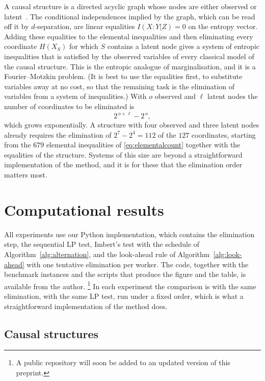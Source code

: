\documentclass[11pt]{article}
\theoremstyle{definition}
\begin{document}
A causal structure is a directed acyclic graph whose nodes are either observed or latent~\cite{pearl2009}. The conditional independences implied by the graph, which can be read off it by $d$-separation, are linear equalities $I(X\!:\!Y|Z)=0$ on the entropy vector. Adding these equalities to the elemental inequalities and then eliminating every coordinate $H(X_S)$ for which $S$ contains a latent node gives a system of entropic inequalities that is satisfied by the observed variables of every classical model of the causal structure. This is the entropic analogue of marginalisation, and it is a Fourier--Motzkin problem. (It is best to use the equalities first, to substitute variables away at no cost, so that the remaining task is the elimination of variables from a system of inequalities.) With $o$ observed and $\ell$ latent nodes the number of coordinates to be eliminated is
\begin{equation}
2^{\,o+\ell}-2^{\,o},
\label{eq:elimcount}
\end{equation}
which grows exponentially. A structure with four observed and three latent nodes already requires the elimination of $2^7-2^4=112$ of the $127$ coordinates, starting from the $679$ elemental inequalities of \eqref{eq:elementalcount} together with the equalities of the structure. Systems of this size are beyond a straightforward implementation of the method, and it is for these that the elimination order matters most.

\section{Computational results}
\label{sec:results}

All experiments use our Python implementation, which contains the elimination step, the sequential LP test, Imbert's test with the schedule of Algorithm~\ref{alg:alternation}, and the look-ahead rule of Algorithm~\ref{alg:look-ahead} with one tentative elimination per worker. The code, together with the benchmark instances and the scripts that produce the figure and the table, is available from the author.%
\footnote{A public repository will soon be added to an updated version of this preprint.}
In each experiment the comparison is with the same elimination, with the same LP test, run under a fixed order, which is what a straightforward implementation of the method does.

\subsection{Causal structures}
\label{sec:resultscausal}
\end{document}
